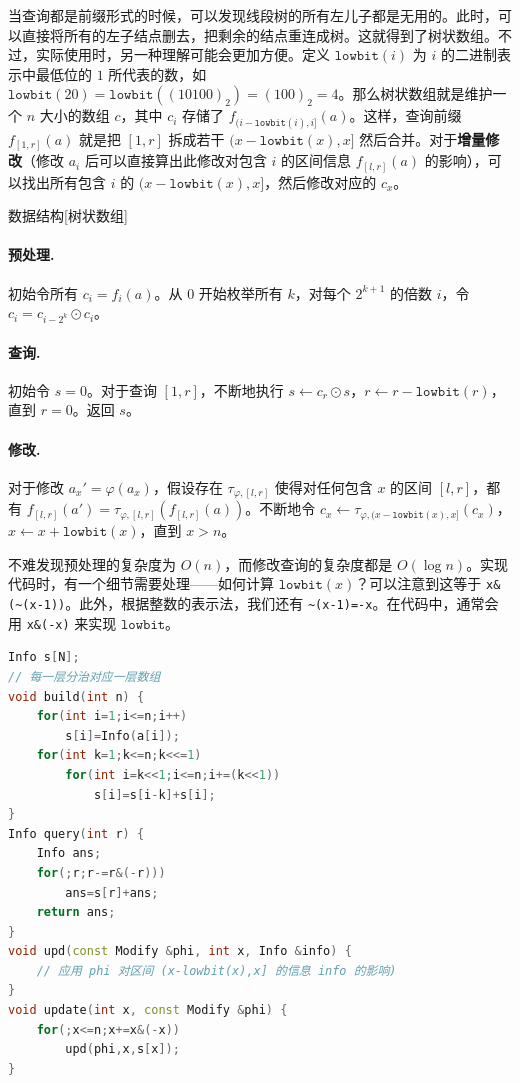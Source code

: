 当查询都是前缀形式的时候，可以发现线段树的所有左儿子都是无用的。此时，可以直接将所有的左子结点删去，把剩余的结点重连成树。这就得到了树状数组。不过，实际使用时，另一种理解可能会更加方便。定义 $\mathtt{lowbit}(i)$ 为 $i$ 的二进制表示中最低位的 $1$ 所代表的数，如 $\mathtt{lowbit}(20)=\mathtt{lowbit}((10100)_2)=(100)_2=4$。那么树状数组就是维护一个 $n$ 大小的数组 $c$，其中 $c_i$ 存储了 $f_{(i-\mathtt{lowbit}(i),i]}(a)$。这样，查询前缀 $f_{[1,r]}(a)$ 就是把 $[1,r]$ 拆成若干 $(x-\mathtt{lowbit}(x),x]$ 然后合并。对于\textbf{增量修改}（修改 $a_i$ 后可以直接算出此修改对包含 $i$ 的区间信息 $f_{[l,r]}(a)$ 的影响），可以找出所有包含 $i$ 的 $(x-\mathtt{lowbit}(x),x]$，然后修改对应的 $c_x$。

\begin{descbox}{数据结构}[树状数组]\label{desc: Fenwick tree}

\paragraph{预处理. }初始令所有 $c_i=f_{i}(a)$。从 $0$ 开始枚举所有 $k$，对每个 $2^{k+1}$ 的倍数 $i$，令 $c_i=c_{i-2^k}\odot c_i$。

\paragraph{查询. }初始令 $s=0$。对于查询 $[1,r]$，不断地执行 $s\gets c_r\odot s$，$r\gets r-\mathtt{lowbit}(r)$，直到 $r=0$。返回 $s$。

\paragraph{修改. }对于修改 $a_x'=\varphi(a_x)$，假设存在 $\tau_{\varphi,[l,r]}$ 使得对任何包含 $x$ 的区间 $[l,r]$，都有 $f_{[l,r]}(a')=\tau_{\varphi,[l,r]}(f_{[l,r]}(a))$。不断地令 $c_x\gets \tau_{\varphi,(x-\mathtt{lowbit}(x),x]}(c_x)$，$x\gets x+\mathtt{lowbit}(x)$，直到 $x>n$。
\end{descbox}

不难发现预处理的复杂度为 $O(n)$，而修改查询的复杂度都是 $O(\log n)$。实现代码时，有一个细节需要处理——如何计算 $\mathtt{lowbit}(x)$？可以注意到这等于 \verb|x&(~(x-1))|。此外，根据整数的表示法，我们还有 \verb|~(x-1)=-x|。在代码中，通常会用 \verb|x&(-x)| 来实现 $\mathtt{lowbit}$。
\begin{lstlisting}[language=C++, caption={树状数组}]
Info s[N];
// 每一层分治对应一层数组
void build(int n) {
    for(int i=1;i<=n;i++)
        s[i]=Info(a[i]);
    for(int k=1;k<=n;k<<=1)
        for(int i=k<<1;i<=n;i+=(k<<1))
            s[i]=s[i-k]+s[i];
}
Info query(int r) {
    Info ans;
    for(;r;r-=r&(-r)))
        ans=s[r]+ans;
    return ans;
}
void upd(const Modify &phi, int x, Info &info) {
    // 应用 phi 对区间 (x-lowbit(x),x] 的信息 info 的影响)
}
void update(int x, const Modify &phi) {
    for(;x<=n;x+=x&(-x))
        upd(phi,x,s[x]);
}
\end{lstlisting}

